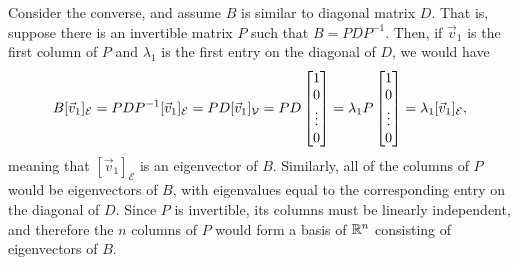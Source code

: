\documentclass{workbook}
\begin{document}
\begin{slide}
\begin{parts}
\begin{solution}
				Consider the converse, and assume $B$ is similar to diagonal
				matrix $D$. That is, suppose there is an invertible matrix
				$P$ such that $B=PDP^{-1}$. Then, if $\vec v_1$ is the first
				column of $P$ and $\lambda_1$ is the first entry on	the diagonal
				of $D$, we would have
				\[
					B[\vec v_1]_{\mathcal E}
					=PDP^{-1}[\vec v_1]_{\mathcal E}
					=PD[\vec v_1]_{\mathcal V}
					=PD\begin{bmatrix}1\\0\\\vdots\\0\end{bmatrix}
					=\lambda_1P\begin{bmatrix}1\\0\\\vdots\\0\end{bmatrix}
					=\lambda_1[\vec v_1]_{\mathcal E},
				\]
				meaning that $[\vec v_1]_{\mathcal E}$ is an eigenvector of $B$. Similarly, all
				of the columns of $P$ would be eigenvectors of $B$, with eigenvalues
				equal to the corresponding entry on the diagonal of $D$. Since $P$ is
				invertible, its columns must be linearly independent, and therefore
				the $n$ columns of $P$ would form a basis of $\mathbb{R}^n$ consisting of
				eigenvectors of $B$.
			\end{solution}
	\end{parts}
\end{slide}
\end{document}
